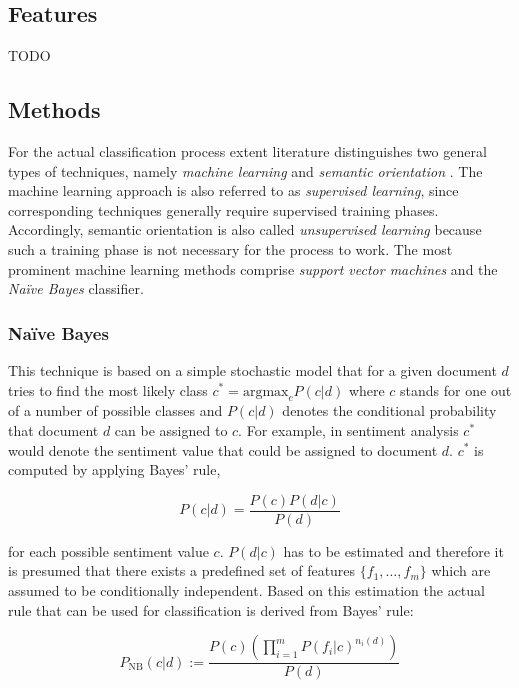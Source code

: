 \subsection{Features}

TODO

\subsection{Methods}

For the actual classification process extent literature distinguishes two general types of techniques, namely \emph{machine learning} and \emph{semantic orientation} \cite{Ye20096527}. The machine learning approach is also referred to as \emph{supervised learning}, since corresponding techniques generally require supervised training phases. Accordingly, semantic orientation is also called \emph{unsupervised learning} because such a training phase is not necessary for the process to work. The most prominent machine learning methods comprise \emph{support vector machines} and the \emph{Na\"ive Bayes} classifier.

\subsubsection*{Na\"ive Bayes}

This technique is based on a simple stochastic model that for a given document $d$ tries to find the most likely class $c^* = \mathrm{arg max}_c P(c \vert d)$ where $c$ stands for one out of a number of possible classes and $P(c \vert d)$ denotes the conditional probability that document $d$ can be assigned to $c$. For example, in sentiment analysis $c^*$ would denote the sentiment value that could be assigned to document $d$. $c^*$ is computed by applying Bayes' rule,

\begin{equation*}
P(c \vert d) = \frac{P(c)P(d \vert c)}{P(d)}
\end{equation*}

for each possible sentiment value $c$. $P(d \vert c)$ has to be estimated and therefore it is presumed that there exists a predefined set of features $\lbrace f_1, \ldots , f_m \rbrace$ which are assumed to be conditionally independent. Based on this estimation the actual rule that can be used for classification is derived from Bayes' rule:

\begin{equation*}
P_{\mathrm{NB}}(c \vert d) := \frac{P(c)(\prod^{m}_{i=1}P(f_i \vert c)^{n_i(d)})}{P(d)}
\end{equation*}

